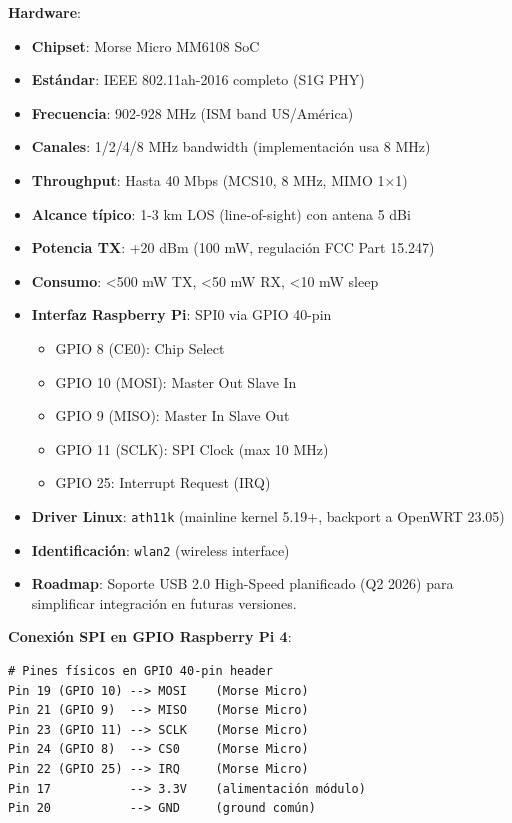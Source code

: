 \textbf{Hardware}:
\begin{itemize}
    \item \textbf{Chipset}: Morse Micro MM6108 SoC
    \item \textbf{Estándar}: IEEE 802.11ah-2016 completo (S1G PHY)
    \item \textbf{Frecuencia}: 902-928 MHz (ISM band US/América)
    \item \textbf{Canales}: 1/2/4/8 MHz bandwidth (implementación usa 8 MHz)
    \item \textbf{Throughput}: Hasta 40 Mbps (MCS10, 8 MHz, MIMO 1$\times$1)
    \item \textbf{Alcance típico}: 1-3 km LOS (line-of-sight) con antena 5 dBi
    \item \textbf{Potencia TX}: +20 dBm (100 mW, regulación FCC Part 15.247)
    \item \textbf{Consumo}: <500 mW TX, <50 mW RX, <10 mW sleep
    \item \textbf{Interfaz Raspberry Pi}: SPI0 via GPIO 40-pin
    \begin{itemize}
        \item GPIO 8 (CE0): Chip Select
        \item GPIO 10 (MOSI): Master Out Slave In
        \item GPIO 9 (MISO): Master In Slave Out
        \item GPIO 11 (SCLK): SPI Clock (max 10 MHz)
        \item GPIO 25: Interrupt Request (IRQ)
    \end{itemize}
    \item \textbf{Driver Linux}: \texttt{ath11k} (mainline kernel 5.19+, backport a OpenWRT 23.05)
    \item \textbf{Identificación}: \texttt{wlan2} (wireless interface)
    \item \textbf{Roadmap}: Soporte USB 2.0 High-Speed planificado (Q2 2026) para simplificar integración en futuras versiones.
\end{itemize}

\textbf{Conexión SPI en GPIO Raspberry Pi 4}:
\begin{verbatim}
# Pines físicos en GPIO 40-pin header
Pin 19 (GPIO 10) --> MOSI    (Morse Micro)
Pin 21 (GPIO 9)  --> MISO    (Morse Micro)
Pin 23 (GPIO 11) --> SCLK    (Morse Micro)
Pin 24 (GPIO 8)  --> CS0     (Morse Micro)
Pin 22 (GPIO 25) --> IRQ     (Morse Micro)
Pin 17           --> 3.3V    (alimentación módulo)
Pin 20           --> GND     (ground común)
\end{verbatim}

